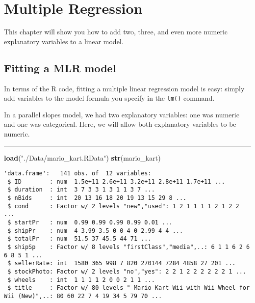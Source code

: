 \documentclass[]{book}
\newenvironment{Shaded}{\begin{snugshade}}{\end{snugshade}}
\newcommand{\KeywordTok}[1]{\textcolor[rgb]{0.13,0.29,0.53}{\textbf{#1}}}
\newcommand{\StringTok}[1]{\textcolor[rgb]{0.31,0.60,0.02}{#1}}
\newcommand{\NormalTok}[1]{#1}
\begin{document}
\chapter{Multiple Regression}\label{multiple-regression}

This chapter will show you how to add two, three, and even more numeric
explanatory variables to a linear model.

\section{Fitting a MLR model}\label{fitting-a-mlr-model}

In terms of the R code, fitting a multiple linear regression model is
easy: simply add variables to the model formula you specify in the
\texttt{lm()} command.

In a parallel slopes model, we had two explanatory variables: one was
numeric and one was categorical. Here, we will allow both explanatory
variables to be numeric.

\begin{center}\rule{0.5\linewidth}{\linethickness}\end{center}

\begin{Shaded}
\begin{Highlighting}[]
\KeywordTok{load}\NormalTok{(}\StringTok{"./Data/mario_kart.RData"}\NormalTok{)}
\KeywordTok{str}\NormalTok{(mario_kart)}
\end{Highlighting}
\end{Shaded}

\begin{verbatim}
'data.frame':   141 obs. of  12 variables:
 $ ID        : num  1.5e+11 2.6e+11 3.2e+11 2.8e+11 1.7e+11 ...
 $ duration  : int  3 7 3 3 1 3 1 1 3 7 ...
 $ nBids     : int  20 13 16 18 20 19 13 15 29 8 ...
 $ cond      : Factor w/ 2 levels "new","used": 1 2 1 1 1 1 2 1 2 2 ...
 $ startPr   : num  0.99 0.99 0.99 0.99 0.01 ...
 $ shipPr    : num  4 3.99 3.5 0 0 4 0 2.99 4 4 ...
 $ totalPr   : num  51.5 37 45.5 44 71 ...
 $ shipSp    : Factor w/ 8 levels "firstClass","media",..: 6 1 1 6 2 6 6 8 5 1 ...
 $ sellerRate: int  1580 365 998 7 820 270144 7284 4858 27 201 ...
 $ stockPhoto: Factor w/ 2 levels "no","yes": 2 2 1 2 2 2 2 2 2 1 ...
 $ wheels    : int  1 1 1 1 2 0 0 2 1 1 ...
 $ title     : Factor w/ 80 levels " Mario Kart Wii with Wii Wheel for Wii (New)",..: 80 60 22 7 4 19 34 5 79 70 ...
\end{verbatim}
\end{document}
